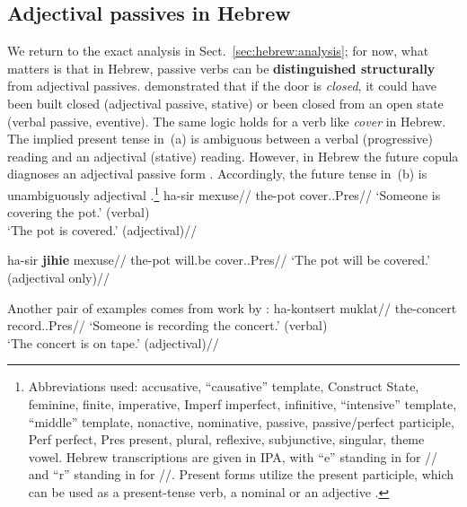 	\subsection{Adjectival passives in Hebrew}
We return to the exact analysis in Sect.~\ref{sec:hebrew:analysis}; for now, what matters is that in Hebrew, passive verbs can be \textbf{distinguished structurally} from adjectival passives. \cite{embick04li} demonstrated that if the door is \emph{closed}, it could have been built closed (adjectival passive, stative) or been closed from an open state (verbal passive, eventive). The same logic holds for a verb like \emph{cover} in Hebrew. The implied present tense in~(\nextx a) is ambiguous between a verbal (progressive) reading and an adjectival (stative) reading. However, in Hebrew the future copula diagnoses an adjectival passive form \citep{doron00}. Accordingly, the future tense in~(\nextx b) is unambiguously adjectival \citep{doron00,horvathsiloni08,meltzerasscher11}.\footnote{Abbreviations used:  accusative,  ``causative'' template,  Construct State,  feminine,  finite,  imperative, Imperf imperfect,  infinitive,  ``intensive'' template,  ``middle'' template,  nonactive,  nominative,  passive,  passive/perfect participle, Perf perfect, Pres present,  plural,  reflexive,  subjunctive,  singular,  theme vowel. Hebrew transcriptions are given in IPA, with ``e'' standing in for // and ``r'' standing in for //. Present forms utilize the present participle, which can be used as a present-tense verb, a nominal or an adjective \citep{boneh13tense,doron13ehll}.}
\pex \label{ex:pres-ambig}
    \a \begingl
        \gla{}ha-sir mexuse//
        \glb the-pot cover..Pres//
        \glft `Someone is covering the pot.' (verbal)\\`The pot is covered.' (adjectival)//
    \endgl
        
    \a \begingl
        \gla{}ha-sir \textbf{jihie} mexuse//
        \glb the-pot will.be cover..Pres//
        \glft `The pot will be covered.' (adjectival only)//
    \endgl
\xe

Another pair of examples comes from work by \cite{doron00}:
\pex \label{ex:pres-ambig2}
    \a \begingl
        \gla{}ha-kontsert muklat//
        \glb the-concert record..Pres//
        \glft `Someone is recording the concert.' (verbal)\\`The concert is on tape.' (adjectival)//
    \endgl
        
